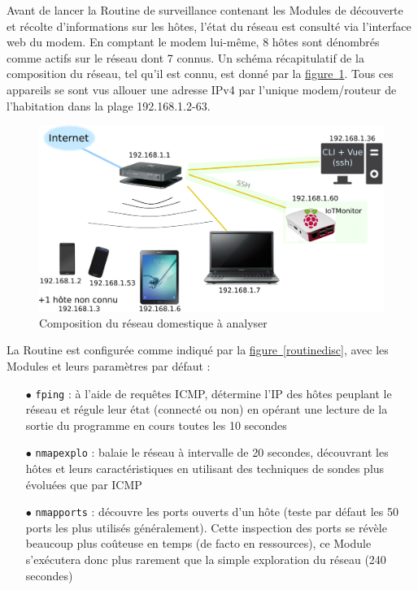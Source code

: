 \documentclass[]{article}
\newcommand{\wordlink}[2]{\hyperref[#1]{#2~\ref{#1}}}
\begin{document}
Avant de lancer la Routine de surveillance contenant les Modules de découverte et récolte d'informations sur les hôtes, l'état du réseau est consulté via l'interface web du modem. En comptant le modem lui-même, 8 hôtes sont dénombrés comme actifs sur le réseau dont 7 connus. Un schéma récapitulatif de la composition du réseau, tel qu'il est connu, est donné par la \wordlink{mynetwork}{figure}. Tous ces appareils se sont vus allouer une adresse IPv4 par l'unique modem/routeur de l'habitation dans la plage 192.168.1.2-63.\\

\begin{figure}[!ht]
\centering
     \includegraphics[width=0.75\linewidth]{mynetwork}
     \caption{Composition du réseau domestique à analyser}
     \label{mynetwork}
\end{figure}

\vspace{0.1cm}

\par La Routine est configurée comme indiqué par la \wordlink{routinedisc}{figure}, avec les Modules et leurs paramètres par défaut :\\
\begin{itemize}
\item[$\bullet$] \texttt{fping} : à l'aide de requêtes ICMP, détermine l'IP des hôtes peuplant le réseau et régule leur état (connecté ou non) en opérant une lecture de la sortie du programme en cours toutes les 10 secondes
\vspace{0.1cm}
\item[$\bullet$] \texttt{nmapexplo} : balaie le réseau à intervalle de 20 secondes, découvrant les hôtes et leurs caractéristiques en utilisant des techniques de sondes plus évoluées que par ICMP
\vspace{0.1cm}
\item[$\bullet$] \texttt{nmapports} : découvre les ports ouverts d'un hôte (teste par défaut les 50 ports les plus utilisés généralement). Cette inspection des ports se révèle beaucoup plus coûteuse en temps (de facto en ressources), ce Module s'exécutera donc plus rarement que la simple exploration du réseau (240 secondes)

\end{itemize}
\end{document}
